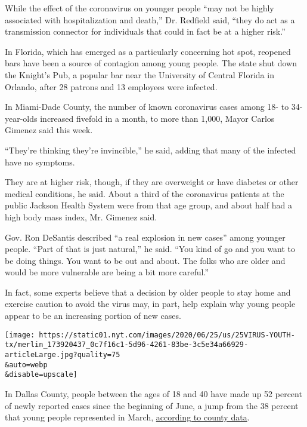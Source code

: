 While the effect of the coronavirus on younger people ``may not be
highly associated with hospitalization and death,'' Dr. Redfield said,
``they do act as a transmission connector for individuals that could in
fact be at a higher risk.''

In Florida, which has emerged as a particularly concerning hot spot,
reopened bars have been a source of contagion among young people. The
state shut down the Knight's Pub, a popular bar near the University of
Central Florida in Orlando, after 28 patrons and 13 employees were
infected.

In Miami-Dade County, the number of known coronavirus cases among 18- to
34-year-olds increased fivefold in a month, to more than 1,000, Mayor
Carlos Gimenez said this week.

``They're thinking they're invincible,'' he said, adding that many of
the infected have no symptoms.

They are at higher risk, though, if they are overweight or have diabetes
or other medical conditions, he said. About a third of the coronavirus
patients at the public Jackson Health System were from that age group,
and about half had a high body mass index, Mr. Gimenez said.

Gov. Ron DeSantis described ``a real explosion in new cases'' among
younger people. ``Part of that is just natural,'' he said. ``You kind of
go and you want to be doing things. You want to be out and about. The
folks who are older and would be more vulnerable are being a bit more
careful.''

In fact, some experts believe that a decision by older people to stay
home and exercise caution to avoid the virus may, in part, help explain
why young people appear to be an increasing portion of new cases.

\texttt{[image: https://static01.nyt.com/images/2020/06/25/us/25VIRUS-YOUTH-tx/merlin\_173920437\_0c7f16c1-5d96-4261-83be-3c5e34a66929-articleLarge.jpg?quality=75\\\&auto=webp\\\&disable=upscale]}

In Dallas County, people between the ages of 18 and 40 have made up 52
percent of newly reported cases since the beginning of June, a jump from
the 38 percent that young people represented in March,
\href{https://www.dallascounty.org/Assets/uploads/docs/hhs/2019-nCoV/COVID-19\%20DCHHS\%20Summary_062320.pdf}{according
to county data}.

\href{https://www.nytimes.com/news-event/coronavirus?action=click\&pgtype=Article\&state=default\&region=MAIN_CONTENT_3\&context=storylines_faq}{}


